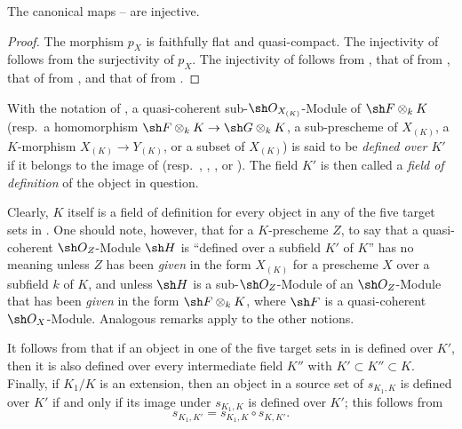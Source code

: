 \begin{proposition}[4.8.3]
\label{IV.4.8.3}
The canonical maps -- are
injective.
\end{proposition}

\begin{proof}
The morphism $p_X$ is faithfully flat and quasi-compact.
The injectivity of  follows from the surjectivity of
$p_X$.
The injectivity of  follows from
, that of  from
, that of  from
, and that of  from
.
\end{proof}


\begin{definition}[4.8.4]
\label{IV.4.8.4}
With the notation of , a quasi-coherent
sub-$\sh O_{X_{(K)}}$-Module of $\sh F\otimes_kK$
(resp.\ a homomorphism
$\sh F\otimes_kK\to\sh G\otimes_kK$, a sub-prescheme of $X_{(K)}$,
a $K$-morphism $X_{(K)}\to Y_{(K)}$, or a subset of $X_{(K)}$)
is said to be \emph{defined over $K'$} if it belongs to the image of
(resp.\ , ,
, or ).
The field $K'$ is then called a \emph{field of definition} of the
object in question.
\end{definition}

Clearly, $K$ itself is a field of definition for every object in any
of the five target sets in .
One should note, however, that for a $K$-prescheme $Z$, to say that a
quasi-coherent $\sh O_Z$-Module $\sh H$ is ``defined over a subfield
$K'$ of $K$'' has no meaning unless $Z$ has been \emph{given} in the
form $X_{(K)}$ for a prescheme $X$ over a subfield $k$ of $K$, and
unless $\sh H$ is a sub-$\sh O_Z$-Module of an $\sh O_Z$-Module that
has been \emph{given} in the form $\sh F\otimes_kK$, where $\sh F$ is
a quasi-coherent $\sh O_X$-Module.
Analogous remarks apply to the other notions.

It follows from  that if an object in one of the
five target sets in  is defined over $K'$, then it is
also defined over every intermediate field $K''$ with
$K'\subset K''\subset K$.
Finally, if $K_1/K$ is an extension, then an object in a source set
of $s_{K_1,K}$ is defined over $K'$ if and only if its image under
$s_{K_1,K}$ is defined over $K'$; this follows from
\[
s_{K_1,K'}=s_{K_1,K}\circ s_{K,K'}.
\]

